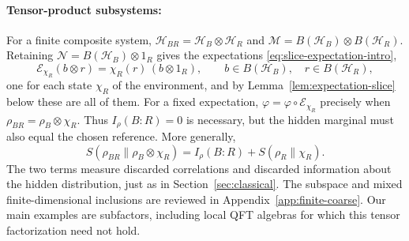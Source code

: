 \documentclass[a4paper,11pt]{article}
\theoremstyle{definition}
\newcommand{\mH}{\mathcal{H}}
\newcommand{\mE}{\mathcal{E}}
\begin{document}
\paragraph{Tensor-product subsystems:}
For a finite composite system, $\mathcal H_{BR}=\mH_B\otimes\mH_R$ and
$\mathcal M=B(\mathcal H_B)\otimes B(\mathcal H_R)$. Retaining $\mathcal N=B(\mathcal H_B)\otimes1_R$ gives the expectations \eqref{eq:slice-expectation-intro},
\begin{equation}\label{condexp}
 \mE_{\chi_R}(b\otimes r)=\chi_R(r)\,(b\otimes1_R),
 \qquad b\in B(\mathcal H_B),\quad r\in B(\mathcal H_R),
\end{equation}
one for each state $\chi_R$ of the environment, and by Lemma~\ref{lem:expectation-slice} below these are all of them.
For a fixed expectation, $\varphi=\varphi\circ\mE_{\chi_R}$ precisely when
$\rho_{BR}=\rho_B\otimes\chi_R$. Thus $I_\rho(B:R)=0$ is necessary, but the hidden
marginal must also equal the chosen reference. More generally,
\begin{equation}\label{eq:quantum-coarse-entropy-decomposition}
 S(\rho_{BR}\|\rho_B\otimes\chi_R)
 =I_\rho(B:R)+S(\rho_R\|\chi_R).
\end{equation}
The two terms measure discarded correlations and discarded information about the
hidden distribution, just as in Section~\ref{sec:classical}.
The subspace and mixed finite-dimensional inclusions are reviewed in
Appendix~\ref{app:finite-coarse}. Our main examples are subfactors, including
local QFT algebras for which this tensor factorization need not hold.
\end{document}
